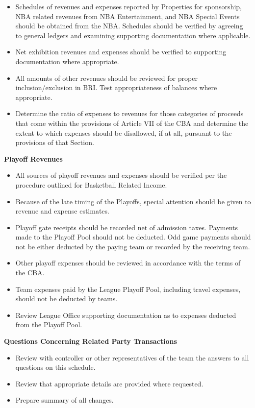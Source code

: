 \documentclass[
]{book}
\providecommand{\tightlist}{%
  \setlength{\itemsep}{0pt}\setlength{\parskip}{0pt}}
\begin{document}
\begin{itemize}
\item
  Schedules of revenues and expenses reported by Properties for sponsorship, NBA related revenues from NBA Entertainment, and NBA Special Events should be obtained from the NBA. Schedules should be verified by agreeing to general ledgers and examining supporting documentation where applicable.
\item
  Net exhibition revenues and expenses should be verified to supporting documentation where appropriate.
\item
  All amounts of other revenues should be reviewed for proper inclusion/exclusion in BRI. Test appropriateness of balances where appropriate.
\item
  Determine the ratio of expenses to revenues for those categories of proceeds that come within the provisions of Article VII of the CBA and determine the extent to which expenses should be disallowed, if at all, pursuant to the provisions of that Section.
\end{itemize}

\textbf{Playoff Revenues}

\begin{itemize}
\tightlist
\item
  All sources of playoff revenues and expenses should be verified per the procedure outlined for Basketball Related Income.
\item
  Because of the late timing of the Playoffs, special attention should be given to revenue and expense estimates.
\item
  Playoff gate receipts should be recorded net of admission taxes. Payments made to the Playoff Pool should not be deducted. Odd game payments should not be either deducted by the paying team or recorded by the receiving team.
\item
  Other playoff expenses should be reviewed in accordance with the terms of the CBA.
\item
  Team expenses paid by the League Playoff Pool, including travel expenses, should not be deducted by teams.
\item
  Review League Office supporting documentation as to expenses deducted from the Playoff Pool.
\end{itemize}

\textbf{Questions Concerning Related Party Transactions}

\begin{itemize}
\tightlist
\item
  Review with controller or other representatives of the team the answers to all questions on this schedule.
\item
  Review that appropriate details are provided where requested.
\item
  Prepare summary of all changes.
\end{itemize}
\end{document}
